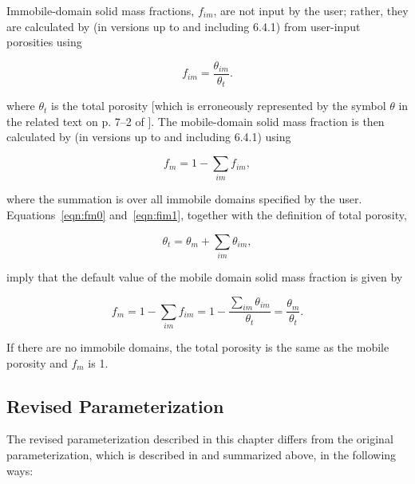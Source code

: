 

Immobile-domain solid mass fractions, $f_{im}$, are not input by the user; rather, they are calculated by \mf (in versions up to and including 6.4.1) from user-input porosities using

\begin{equation}
\label{eqn:fim1}
f_{im} = \frac{\theta_{im}}{\theta_t}.
\end{equation}

\noindent where $\theta_t$ is the total porosity [which is erroneously represented by the symbol $\theta$ in the related text on p. 7--2 of \cite{modflow6gwt}]. The mobile-domain solid mass fraction is then calculated by \mf (in versions up to and including 6.4.1) using

\begin{equation}
\label{eqn:fm0}
f_m = 1 - \sum_{im}f_{im},
\end{equation}

\noindent where the summation is over all immobile domains specified by the user. Equations~\ref{eqn:fm0} and~\ref{eqn:fim1}, together with the definition of total porosity,

\begin{equation}
\label{eqn:thetat1}
\theta_t = \theta_m + \sum_{im}{\theta_{im}},
\end{equation}

\noindent imply that the default value of the mobile domain solid mass fraction is given by

\begin{equation}
\label{eqn:fm1}
f_m = 1 - \sum_{im}f_{im} = 1 - \frac{\sum_{im}\theta_{im}}{\theta_t} = \frac{\theta_m}{\theta_t}.
\end{equation}

\noindent If there are no immobile domains, the total porosity is the same as the mobile porosity and $f_m$ is 1.

\subsection{Revised Parameterization} \label{sec:revisedparam}

The revised parameterization described in this chapter differs from the original parameterization, which is described in \cite{modflow6gwt} and summarized above, in the following ways:

